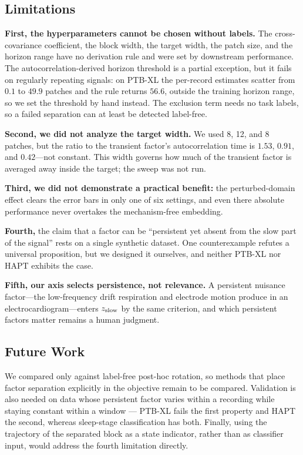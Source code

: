 \subsection{Limitations}

\textbf{First, the hyperparameters cannot be chosen without labels.} The
cross-covariance coefficient, the block width, the target width, the patch
size, and the horizon range have no derivation rule and were set by downstream
performance. The autocorrelation-derived horizon threshold is a partial
exception, but it fails on regularly repeating signals: on PTB-XL the per-record estimates scatter from $0.1$ to $49.9$ patches and the rule returns $56.6$, outside the training horizon range, so we set the threshold by hand instead. The exclusion term needs no task labels, so a failed separation can at
least be detected label-free.

\textbf{Second, we did not analyze the target width.} We used 8, 12, and 8
patches, but the ratio to the transient factor's autocorrelation time is
$1.53$, $0.91$, and $0.42$---not constant. This width governs how much of the
transient factor is averaged away inside the target; the sweep was not run.

\textbf{Third, we did not demonstrate a practical benefit:} the perturbed-domain effect clears the error bars in only one of six settings, and even there absolute performance never overtakes the mechanism-free embedding.

\textbf{Fourth,} the claim that a factor can be ``persistent yet absent from
the slow part of the signal'' rests on a single synthetic dataset. One
counterexample refutes a universal proposition, but we designed it ourselves,
and neither PTB-XL nor HAPT exhibits the case.

\textbf{Fifth, our axis selects persistence, not relevance.} A persistent
nuisance factor---the low-frequency drift respiration and electrode motion
produce in an electrocardiogram---enters $z_{\mathrm{slow}}$ by the same criterion, and
which persistent factors matter remains a human judgment.

\subsection{Future Work}

We compared only against label-free post-hoc rotation, so methods that place factor separation explicitly in the objective remain to be compared. Validation is also needed on data whose persistent factor varies within a recording while staying constant within a window --- PTB-XL fails the first property and HAPT the second, whereas sleep-stage classification has both. Finally, using the trajectory of the separated block as a state indicator, rather than as classifier input, would address the fourth limitation directly.
